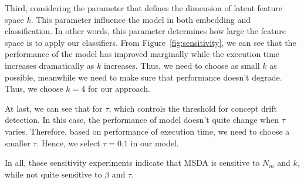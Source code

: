Third, considering the parameter that defines the dimension of latent feature space $k$. This parameter influence the model in both embedding and classification. In other words, this parameter determines how large the feature space is to apply our classifiers. From Figure~\ref{fig:sensitivity}, we can see that the performance of the model has improved marginally while the execution time increases dramatically as $k$ increases. Thus, we need to choose as small $k$ as possible, meanwhile we need to make sure that performance doesn't degrade. Thus, we choose $k = 4$ for our approach.

At last, we can see that for $\tau$, which controls the threshold for concept drift detection. In this case, the performance of model doesn't quite change when $\tau$ varies. Therefore, based on performance of execution time, we need to choose a smaller $\tau$. Hence, we select $\tau = 0.1$ in our model.

In all, those sensitivity experiments indicate that MSDA is sensitive to $N_m$ and $k$, while not quite sensitive to $\beta$ and $\tau$. 